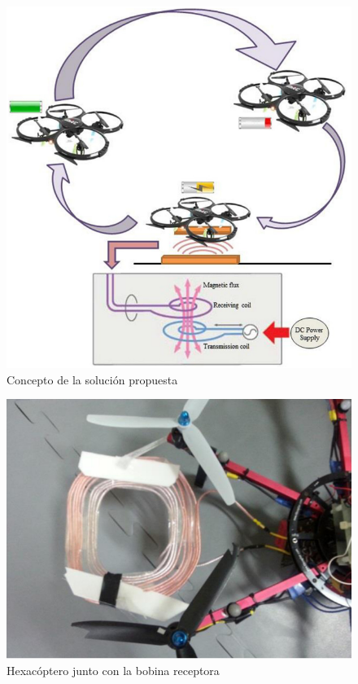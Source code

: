 \begin{figure}[H]
    \centering
    \includegraphics[scale=.4]{imagenes/AUV.png}
    \caption{Concepto de la solución propuesta \cite{junaid_design_2016}}
    \label{fig:1}
\end{figure}

\begin{figure}[H]
    \centering
    \includegraphics[scale=.4]{imagenes/cuadracoptero.png}
    \caption{Hexacóptero junto con la bobina receptora \cite{junaid_design_2016}}
    \label{fig:hexacoptero}
\end{figure}




